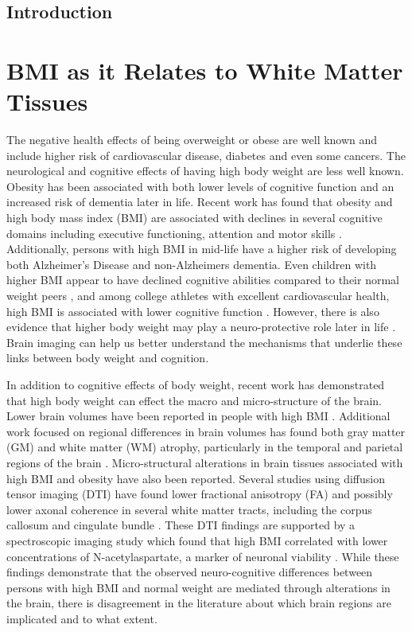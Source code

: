 \section{Introduction}
\chapter{BMI as it Relates to White Matter Tissues}

	The negative health effects of being overweight or obese are well known and include higher risk of cardiovascular disease, diabetes and even some cancers. The neurological and cognitive effects of having high body weight are less well known. Obesity has been associated with both lower levels of cognitive function and an increased risk of dementia later in life. Recent work has found that obesity and high body mass index (BMI) are associated with declines in several cognitive domains including executive functioning, attention and motor skills \cite{Memel_2016,Yau_2012,Gunstad_2007,Nguyen_2014}. Additionally, persons with high BMI in mid-life have a higher risk of developing both Alzheimer's Disease and non-Alzheimers dementia. Even children with higher BMI appear to have declined cognitive abilities compared to their normal weight peers \cite{Liang_2013}, and among college athletes with excellent cardiovascular health, high BMI is associated with lower cognitive function \cite{Fedor_2013}. However, there is also evidence that higher body weight may play a neuro-protective role later in life \cite{Hsu_2015}. Brain imaging can help us better understand the mechanisms that underlie these links between body weight and cognition.
	
	In addition to cognitive effects of body weight, recent work has demonstrated that high body weight can effect the macro and micro-structure of the brain. Lower brain volumes have been reported in people with high BMI \cite{Ho_2010a,Raji_2009}. Additional work focused on regional differences in brain volumes has found both gray matter (GM) and white matter (WM) atrophy, particularly in the temporal and parietal regions of the brain \cite{Willette_2015}. Micro-structural alterations in brain tissues associated with high BMI and obesity have also been reported. Several studies using diffusion tensor imaging (DTI) have found lower fractional anisotropy (FA) and possibly lower axonal coherence in several white matter tracts, including the corpus callosum and cingulate bundle \cite{Bettcher_2013}. These DTI findings are supported by a spectroscopic imaging study which found that high BMI correlated with lower concentrations of N-acetylaspartate, a marker of neuronal viability \cite{Gazdzinski_2008}. While these findings demonstrate that the observed neuro-cognitive differences between persons with high BMI and normal weight are mediated through alterations in the brain, there is disagreement in the literature about which brain regions are implicated and to what extent.
	
